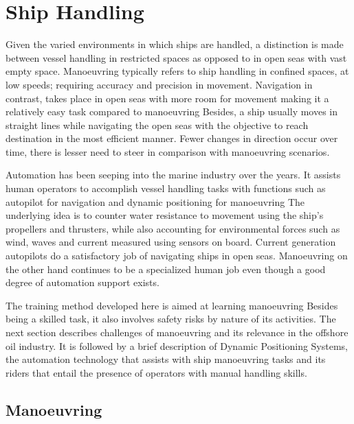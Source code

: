\section{Ship Handling}
\label{sec:shiphandling}
Given the varied environments in which ships are handled, a distinction is made between vessel handling in restricted spaces as opposed to in open seas with vast empty space. Manoeuvring typically refers to ship handling in confined spaces, at low speeds; requiring accuracy and precision in movement. Navigation in contrast, takes place in open seas with more room for movement making it a relatively easy task compared to manoeuvring Besides, a ship usually moves in straight lines while navigating the open seas with the objective to reach destination in the most efficient manner. Fewer changes in direction occur over time, there is lesser need to steer in comparison with manoeuvring scenarios. 

Automation has been seeping into the marine industry over the years. It assists human operators to accomplish vessel handling tasks with functions such as autopilot for navigation and dynamic positioning for manoeuvring The underlying idea is to counter water resistance to movement using the ship's propellers and thrusters, while also accounting for environmental forces such as wind, waves and current measured using sensors on board. Current generation autopilots do a satisfactory job of navigating ships in open seas. Manoeuvring on the other hand continues to be a specialized human job even though a good degree of automation support exists.


The training method developed here is aimed at learning manoeuvring Besides being a skilled task, it also involves safety risks by nature of its activities. The next section describes challenges of manoeuvring and its relevance in the offshore oil industry. It is followed by a brief description of Dynamic Positioning Systems, the automation technology that assists with ship manoeuvring tasks and its riders that entail the presence of operators with manual handling skills. 

\subsection{Manoeuvring}

